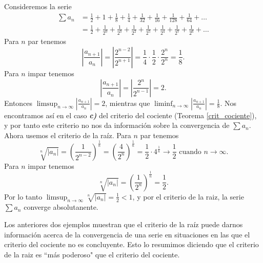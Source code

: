 \begin{example}
  Consideremos la serie
  \begin{align*}
    \sum a_n &= \frac{1}{2}+1+\frac{1}{8}+\frac{1}{4}+\frac{1}{32}+\frac{1}{16}+\frac{1}{128}+\frac{1}{64}+\dots\\[2ex]
    &= \frac{1}{2}+\frac{1}{2^0}+\frac{1}{2^3}+\frac{1}{2^2}+\frac{1}{2^5}+\frac{1}{2^4}+\frac{1}{2^7}+\frac{1}{2^6}+\dots
  \end{align*}
  Para $n$ par tenemos 
  $$\left|\frac{a_{n+1}}{a_n}\right|=\left|\frac{2^{n-2}}{2^{n+1}}\right|=\frac{1}{4}\cdot \frac{1}{2}\cdot\frac{2^n}{2^n}=\frac{1}{8}.$$
  Para $n$ impar tenemos 
  $$\left|\frac{a_{n+1}}{a_n}\right|=\left|\frac{2^n}{2^{n-1}}\right|=2.$$
  Entonces $\limsup_ {n \rightarrow \infty}\left|\frac{a_{n+1}}{a_n}\right|=2$, mientras que $\liminf_ {n \rightarrow \infty}\left|\frac{a_{n+1}}{a_n}\right|=\frac{1}{8}$. Nos encontramos así en el caso \textit{\textbf{c)}} del criterio del cociente (Teorema \ref{crit_cociente}), y por tanto este criterio no nos da información sobre la convergencia de $\sum a_n$.\\
  Ahora usemos el criterio de la raíz. Para $n$ par tenemos
  $$\sqrt[n]{\left|a_n\right|}=\left(\frac{1}{2^{n-2}}\right)^\frac{1}{n}=\left(\frac{4}{2^{n}}\right)^\frac{1}{n}=\frac{1}{2}\cdot 4^\frac{1}{n}\to \frac{1}{2} \text{ cuando }n\to\infty.$$
  Para $n$ impar tenemos
  $$\sqrt[n]{\left|a_n\right|}=\left(\frac{1}{2^{n}}\right)^\frac{1}{n}=\frac{1}{2}.$$
  Por lo tanto $\limsup _{n \rightarrow \infty} \sqrt[n]{\left|a_n\right|}=\frac{1}{2}<1$, y por el criterio de la raiz, la serie $\sum a_n$ converge absolutanente.
\end{example}
\begin{remark}
  Los anteriores dos ejemplos muestran que el criterio de la raíz puede darnos información acerca de la convergencia de una serie en situaciones en las que el criterio del cociente no es concluyente. Esto lo resumimos diciendo que el criterio de la raiz es ``más poderoso" que el criterio del cociente.
\end{remark}

